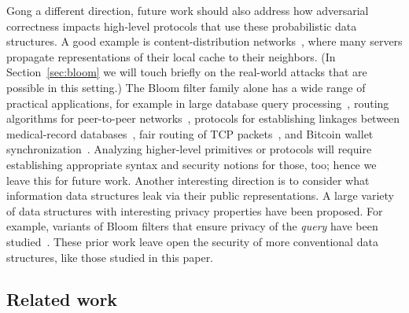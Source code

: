 Gong a different direction, future work should
also address how adversarial correctness impacts high-level protocols that use
these probabilistic data structures. A good example is content-distribution
networks~\cite{byers2002informed}, where many servers propagate representations
of their local cache to their neighbors. (In Section~\ref{sec:bloom} we will
touch briefly on the real-world attacks that are possible in this setting.) The
Bloom filter family alone has a wide range of practical applications, for
example in large database query processing~\cite{broder2004network}, routing
algorithms for peer-to-peer networks~\cite{reynolds2003efficient}, protocols for
establishing linkages between medical-record databases~\cite{schnell2011novel},
fair routing of TCP packets~\cite{feng2001stochastic}, and Bitcoin wallet
synchronization~\cite{gervais2014privacy}.
%
Analyzing higher-level primitives or protocols will require establishing
appropriate syntax and security notions for those, too; hence we leave this for
future work.
%
Another interesting direction is to consider what information data structures
leak via their public representations. A large variety of data structures with
interesting privacy properties have been proposed. For example, variants of
Bloom filters that ensure privacy of the \emph{query} have been
studied~\cite{bellovin2004privacy,nojima2009cryptographically}. These prior work
leave open the security of more conventional data structures, like those studied
in this paper.


\subsection{Related work}



